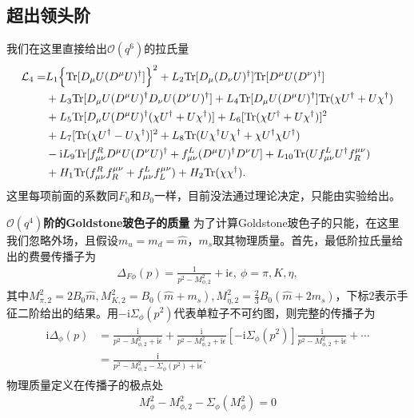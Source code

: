 \documentclass[aps,tightenlines,16pt]{ctexart}
\numberwithin{equation}{section}
\newcommand{\mL}{\mathcal{L}}
\newcommand{\Tr}{\text{Tr}}
\begin{document}
\subsection{超出领头阶}
我们在这里直接给出$\mathcal{O}(q^6)$的拉氏量\cite{GASSER1985465}
\begin{align}
   \begin{aligned}
      \mL_4 = &L_1\Bigl\{\text{Tr}[D_{\mu}U(D^{\mu}U)^{\dagger}]\Bigr\}^2+L_2\text{Tr}[D_{\mu}(D_{\nu}U)^{\dagger}]\Tr[D^{\mu}U(D^{\nu})^{\dagger}]\\
      & +L_3\Tr[D_{\mu}U(D^{\mu}U)^{\dagger}D_{\nu}U(D^{\nu}U)^{\dagger}]+L_4\Tr[D_{\mu}U(D^{\mu}U)^{\dagger}]\Tr(\chi U^{\dagger}+U\chi^{\dagger})\\
      & +L_5\Tr[D_{\mu}U(D^{\mu}U)^{\dagger}(\chi U^{\dagger}+U\chi^{\dagger})]+L_6[\Tr(\chi U^{\dagger}+U\chi^{\dagger})]^2\\
      & +L_7[\Tr(\chi U^{\dagger}-U\chi^{\dagger})]^2+L_8\Tr(U\chi^{\dagger}U\chi^{\dagger}+\chi U^{\dagger}\chi U^{\dagger})\\
      & -\mbox{i}L_9\Tr[f_{\mu\nu}^R D^{\mu}U(D^{\nu}U)^{\dagger}+f_{\mu\nu}^L (D^{\mu}U)^{\dagger}D^{\nu}U]+L_{10}\Tr(Uf_{\mu\nu}^L U^{\dagger}f^{\mu\nu}_R)\\
      & +H_1\Tr(f_{\mu\nu}^Rf_R^{\mu\nu}+f_{\mu\nu}^Lf_L^{\mu\nu})+H_2\Tr(\chi\chi^{\dagger}).
   \end{aligned}
\end{align}
这里每项前面的系数同$F_0$和$B_0$一样，目前没法通过理论决定，只能由实验给出。

\textbf{$\mathcal{O}(q^4)$阶的Goldstone玻色子的质量}
为了计算Goldstone玻色子的只能，在这里我们忽略外场，且假设$m_u=m_d=\hat{m}$，$m_s$取其物理质量。首先，最低阶拉氏量给出的费曼传播子为
\begin{align}
   \Delta_{F\phi}(p)=\frac{1}{p^2-M_{\phi,2}^2}+\mbox{i}\epsilon,\ \phi = \pi,K,\eta,
\end{align}
其中$M_{\pi,2}^2=2B_0\hat{m},M_{K,2}^2=B_0(\hat{m}+m_s),M_{\eta,2}^2=\frac{2}{3}B_0(\hat{m}+2m_s)$，下标2表示手征二阶给出的结果。用$-\mbox{i}\Sigma_{\phi}(p^2)$代表单粒子不可约图，则完整的传播子为
\begin{align}
   \begin{aligned}
   \mbox{i}\Delta_{\phi}(p)&=\frac{\mbox{i}}{p^2-M^{2}_{\phi,2}+\mbox{i}\epsilon}+\frac{\mbox{i}}{p^2-M^{2}_{\phi,2}+\mbox{i}\epsilon}[-\mbox{i}\Sigma_{\phi}(p^2)]\frac{\mbox{i}}{p^2-M^{2}_{\phi,2}+\mbox{i}\epsilon}+\cdots\\
   &=\frac{\mbox{i}}{p^2-M^{2}_{\phi,2}-\Sigma_{\phi}(p^2)+\mbox{i}\epsilon}.
   \end{aligned}
\end{align}
物理质量定义在传播子的极点处
\begin{align}
   M_{\phi}^2 -M_{\phi,2}^2-\Sigma_{\phi}(M_{\phi}^2)=0
\end{align}
\end{document}
